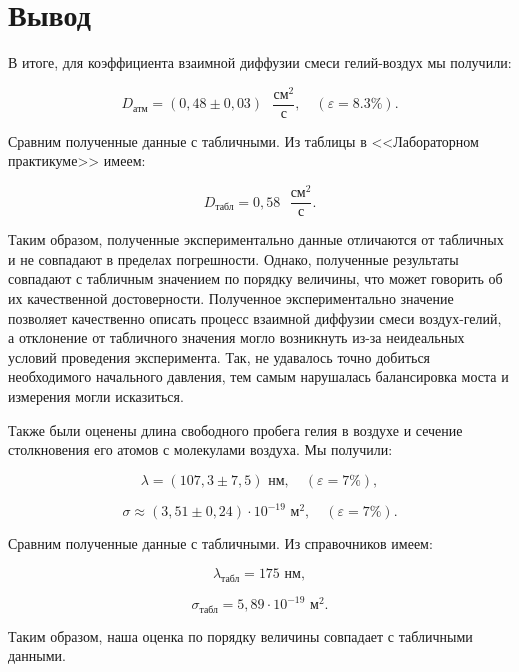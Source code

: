 \documentclass[a4paper, 12pt]{article}%
\begin{document}
\section{Вывод}

В итоге, для коэффициента взаимной диффузии смеси гелий-воздух мы получили:

\[ \boxed{D_\text{атм} = (0,48\pm0,03) \text{ } \frac{\text{см}^2}{\text{с}}}, \quad (\varepsilon = 8.3\%). \]

Сравним полученные данные с табличными. Из таблицы в <<Лабораторном практикуме>> имеем:

\[ D_\text{табл} = 0,58 \text{ } \frac{\text{см}^2}{\text{с}}. \]

Таким образом, полученные экспериментально данные отличаются от табличных и не совпадают в пределах погрешности. Однако, полученные результаты совпадают с табличным значением по порядку величины, что может говорить об их качественной достоверности. Полученное экспериментально значение позволяет качественно описать процесс взаимной диффузии смеси воздух-гелий, а отклонение от табличного значения могло возникнуть из-за неидеальных условий проведения эксперимента. Так, не удавалось точно добиться необходимого начального давления, тем самым нарушалась балансировка моста и измерения могли исказиться.

Также были оценены длина свободного пробега гелия в воздухе и сечение столкновения его атомов с молекулами воздуха. Мы получили:

\[ \boxed{\lambda = (107,3 \pm 7,5) \text{ нм}}, \quad (\varepsilon = 7\%),\]

\[ \boxed{\sigma \approx (3,51 \pm 0,24) \cdot 10^{-19} \text{ м}^2}, \quad (\varepsilon = 7\%).\]

Сравним полученные данные с табличными. Из справочников имеем:

\[ \lambda_\text{табл} = 175 \text{ нм}, \]

\[ \sigma_\text{табл} = 5,89  \cdot 10^{-19} \text{ м}^2.\]

Таким образом, наша оценка по порядку величины совпадает с табличными данными.
\end{document}
